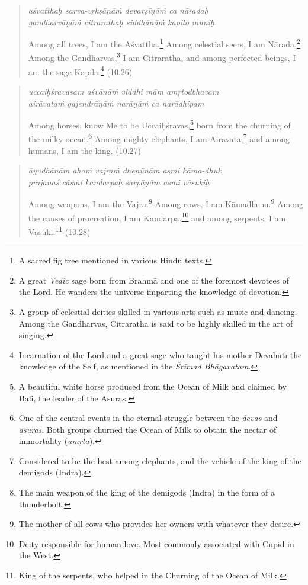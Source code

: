 \documentclass[12pt, twoside, openright]{memoir}
\begin{document}
\par
\begin{verse}
\textit{aśvatthaḥ sarva-vṛkṣāṇāṁ devarṣīṇāṁ ca nāradaḥ} \\
\textit{gandharvāṇāṁ citrarathaḥ siddhānāṁ kapilo muniḥ}

\noindent Among all trees, I am the Aśvattha.\footnote{A sacred fig tree mentioned in various Hindu texts.} Among celestial seers, I am Nārada.\footnote{A great \textit{Vedic} sage born from Brahmā and one of the foremost devotees of the Lord. He wanders the universe imparting the knowledge of devotion.} Among the Gandharvas,\footnote{A group of celestial deities skilled in various arts such as music and dancing. Among the Gandharvas, Citraratha is said to be highly skilled in the art of singing.} I am Citraratha, and among perfected beings, I am the sage Kapila.\footnote{Incarnation of the Lord and a great sage who taught his mother Devahūtī the knowledge of the Self, as mentioned in the \textit{Śrīmad Bhāgavatam}.} (10.26)
\end{verse}
\par



\par
\begin{verse}
\textit{uccaiḥśravasam aśvānāṁ viddhi mām amṛtodbhavam} \\
\textit{airāvataṁ gajendrāṇāṁ narāṇāṁ ca narādhipam}

\noindent Among horses, know Me to be Uccaiḥśravas,\footnote{A beautiful white horse produced from the Ocean of Milk and claimed by Bali, the leader of the Asuras.} born from the churning of the milky ocean.\footnote{One of the central events in the eternal struggle between the \textit{devas} and \textit{asuras}. Both groups churned the Ocean of Milk to obtain the nectar of immortality (\textit{amṛta}).} Among mighty elephants, I am Airāvata,\footnote{Considered to be the best among elephants, and the vehicle of the king of the demigods (Indra).} and among humans, I am the king. (10.27)
\end{verse}
\par



\par
\begin{verse}
\textit{āyudhānām ahaṁ vajraṁ dhenūnām asmi kāma-dhuk} \\
\textit{prajanaś cāsmi kandarpaḥ sarpāṇām asmi vāsukiḥ}

\noindent Among weapons, I am the Vajra.\footnote{The main weapon of the king of the demigods (Indra) in the form of a thunderbolt.} Among cows, I am Kāmadhenu.\footnote{The mother of all cows who provides her owners with whatever they desire.} Among the causes of procreation, I am Kandarpa,\footnote{Deity responsible for human love. Most commonly associated with Cupid in the West.} and among serpents, I am Vāsuki.\footnote{King of the serpents, who helped in the Churning of the Ocean of Milk.} (10.28)
\end{verse}
\par
\end{document}
